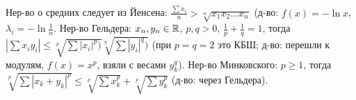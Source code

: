 \section{} %
Нер-во о средних следует из Йенсена: $\frac{\sum x_i}{n} > \sqrt[n]{x_1x_2\dots x_n}$ (д-во: $f(x)=-\ln x$,
$\lambda_i=-\ln\frac1n$.
Нер-во Гельдера: $x_n, y_n \in \mathbb{R}$, $p,q>0$, $\frac1p+\frac1q=1$, тогда $|\sum x_iy_i| \le \sqrt[p]{\sum|x_i|^p)} \sqrt[q]{\sum|y_i|^q)}$
(при $p=q=2$ это КБШ; д-во: перешли к модулям, $f(x)=x^p$, взяли с весами $y_k^q$).
Нер-во Минковского: $p\ge1$, тогда $\sqrt[p]{\sum |x_k+y_k|^p} \le \sqrt[p]{\sum x_k^p} + \sqrt[p]{\sum y_k^p}$ (д-во: через Гельдера).
